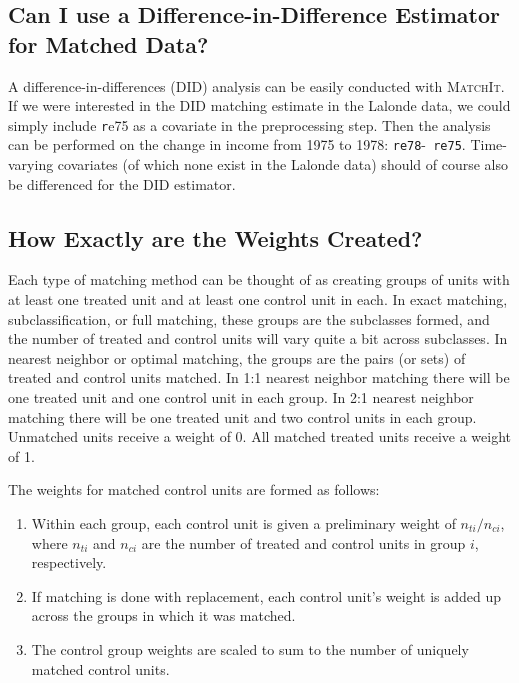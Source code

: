 \documentclass[oneside,letterpaper,titlepage]{article}
\newcommand{\MatchIt}{\textsc{MatchIt}}
\begin{document}
\subsection{Can I use a Difference-in-Difference Estimator for Matched
  Data?}

A difference-in-differences (DID) analysis can be easily conducted
with \MatchIt.  If we were interested in the DID matching estimate in
the Lalonde data, we could simply include {\texttt re75} as a
covariate in the preprocessing step.  Then the analysis can be
performed on the change in income from 1975 to 1978: {\tt re78}-{\tt
  re75}.  Time-varying covariates (of which none exist in the Lalonde
data) should of course also be differenced for the DID estimator.

\subsection{How Exactly are the Weights Created?}
\label{subsec:weights}

Each type of matching method can be thought of as creating groups of
units with at least one treated unit and at least one control unit in
each.  In exact matching, subclassification, or full matching, these
groups are the subclasses formed, and the number of treated and
control units will vary quite a bit across subclasses.  In nearest
neighbor or optimal matching, the groups are the pairs (or sets) of
treated and control units matched.  In 1:1 nearest neighbor matching
there will be one treated unit and one control unit in each group.  In
2:1 nearest neighbor matching there will be one treated unit and two
control units in each group.  Unmatched units receive a weight of 0.
All matched treated units receive a weight of 1.

The weights for matched control units are formed as follows:
\begin{enumerate}
\item Within each group, each control unit is given a preliminary
  weight of $n_{ti}/n_{ci}$, where $n_{ti}$ and $n_{ci}$ are the
  number of treated and control units in group $i$, respectively.
\item If matching is done with replacement, each control unit's weight
  is added up across the groups in which it was matched.
\item The control group weights are scaled to sum to the number of
  uniquely matched control units.
\end{enumerate}
\end{document}
